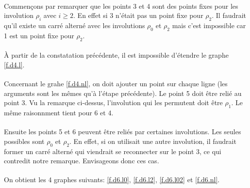 \paragraph{}
Commençons par remarquer que les points 3 et 4 sont des points fixes pour les involution $\rho_i$ avec $i \ge 2$. En effet si 3 n'était pas un point fixe pour $\rho_2$. Il faudrait qu'il existe un carré alterné avec les involutions $\rho_0$ et $\rho_2$ mais c'est impossible car 1 est un point fixe pour $\rho_2$.

\paragraph{}
À partir de la constatation précédente, il est impossible d'étendre le graphe \ref{f.d4.l}.

\paragraph{}
Concernant le grahe \ref{f.d4.nl}, on doit ajouter un point sur chaque ligne (les arguments sont les mêmes qu'à l'étape précédente). Le point 5 doit être relié au point 3. Vu la remarque ci-dessus, l'involution qui les permutent doit être $\rho_1$. Le même raisonnment tient pour 6 et 4.

\paragraph{}
Ensuite les points 5 et 6 peuvent être reliés par certaines involutions. Les seules possibles sont $\rho_0$ et $\rho_2$. En effet, si on utilisait une autre involution, il faudrait former un carré alterné qui viendrait se reconnecter sur le point 3, ce qui contredit notre remarque. Envisageons donc ces cas.

\paragraph{}
On obtient les 4 graphes suivants: \ref{f.d6.l0}, \ref{f.d6.l2}, \ref{f.d6.l02} et \ref{f.d6.nl}.

